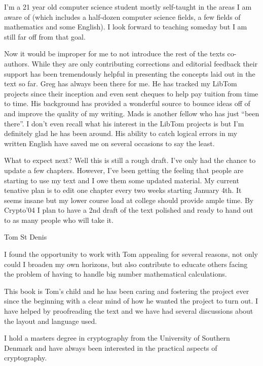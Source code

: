 \documentclass[b5paper]{book}
\begin{document}
I'm a 21 year old computer science student mostly self-taught in the areas I am aware of (which includes a half-dozen
computer science fields, a few fields of mathematics and some English).  I look forward to teaching someday but I am
still far off from that goal.  

Now it would be improper for me to not introduce the rest of the texts co-authors.  While they are only contributing 
corrections and editorial feedback their support has been tremendously helpful in presenting the concepts laid out
in the text so far.  Greg has always been there for me.  He has tracked my LibTom projects since their inception and even
sent cheques to help pay tuition from time to time.  His background has provided a wonderful source to bounce ideas off
of and improve the quality of my writing.  Mads is another fellow who has just ``been there''.  I don't even recall what
his interest in the LibTom projects is but I'm definitely glad he has been around.  His ability to catch logical errors
in my written English have saved me on several occasions to say the least.

What to expect next?  Well this is still a rough draft.  I've only had the chance to update a few chapters.  However, I've
been getting the feeling that people are starting to use my text and I owe them some updated material.  My current tenative
plan is to edit one chapter every two weeks starting January 4th.  It seems insane but my lower course load at college
should provide ample time.  By Crypto'04 I plan to have a 2nd draft of the text polished and ready to hand out to as many
people who will take it.

\begin{flushright} Tom St Denis \end{flushright}

\newpage
I found the opportunity to work with Tom appealing for several reasons, not only could I broaden my own horizons, but also 
contribute to educate others facing the problem of having to handle big number mathematical calculations.

This book is Tom's child and he has been caring and fostering the project ever since the beginning with a clear mind of 
how he wanted the project to turn out. I have helped by proofreading the text and we have had several discussions about 
the layout and language used.

I hold a masters degree in cryptography from the University of Southern Denmark and have always been interested in the 
practical aspects of cryptography. 
\end{document}
